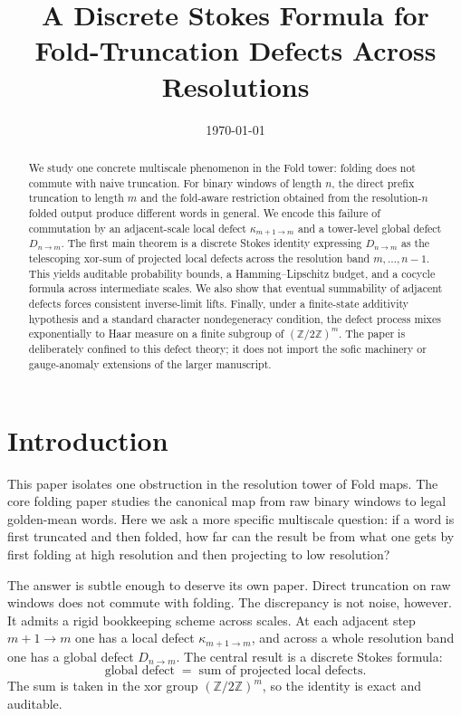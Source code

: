 \documentclass[11pt,letterpaper]{article}
\title{A Discrete Stokes Formula for Fold-Truncation Defects Across Resolutions}
\author{}
\date{\today}
\numberwithin{equation}{section}
\theoremstyle{plain}
\theoremstyle{definition}
\theoremstyle{remark}
\newcommand{\ZZ}{\mathbb{Z}}
\begin{document}
\maketitle

\begin{abstract}
We study one concrete multiscale phenomenon in the Fold tower: folding does not
commute with naive truncation.  For binary windows of length $n$, the direct
prefix truncation to length $m$ and the fold-aware restriction obtained from the
resolution-$n$ folded output produce different words in general.  We encode this
failure of commutation by an adjacent-scale local defect
$\kappa_{m+1\to m}$ and a tower-level global defect $D_{n\to m}$.  The first
main theorem is a discrete Stokes identity expressing $D_{n\to m}$ as the
telescoping xor-sum of projected local defects across the resolution band
$m,\dots,n-1$.  This yields auditable probability bounds, a Hamming--Lipschitz
budget, and a cocycle formula across intermediate scales.  We also show that
eventual summability of adjacent defects forces consistent inverse-limit lifts.
Finally, under a finite-state additivity hypothesis and a standard character
nondegeneracy condition, the defect process mixes exponentially to Haar measure
on a finite subgroup of $(\ZZ/2\ZZ)^m$.  The paper is deliberately confined to
this defect theory; it does not import the sofic machinery or gauge-anomaly
extensions of the larger manuscript.
\end{abstract}

\tableofcontents

\section{Introduction}

This paper isolates one obstruction in the resolution tower of Fold maps.  The
core folding paper studies the canonical map from raw binary windows to legal
golden-mean words.  Here we ask a more specific multiscale question: if a word
is first truncated and then folded, how far can the result be from what one
gets by first folding at high resolution and then projecting to low resolution?

The answer is subtle enough to deserve its own paper.  Direct truncation on raw
windows does not commute with folding.  The discrepancy is not noise, however.
It admits a rigid bookkeeping scheme across scales.  At each adjacent step
$m+1\to m$ one has a local defect $\kappa_{m+1\to m}$, and across a whole
resolution band one has a global defect $D_{n\to m}$.  The central result is a
discrete Stokes formula:
\[
\text{global defect}
\;=\;
\text{sum of projected local defects}.
\]
The sum is taken in the xor group $(\ZZ/2\ZZ)^m$, so the identity is exact and
auditable.
\end{document}
